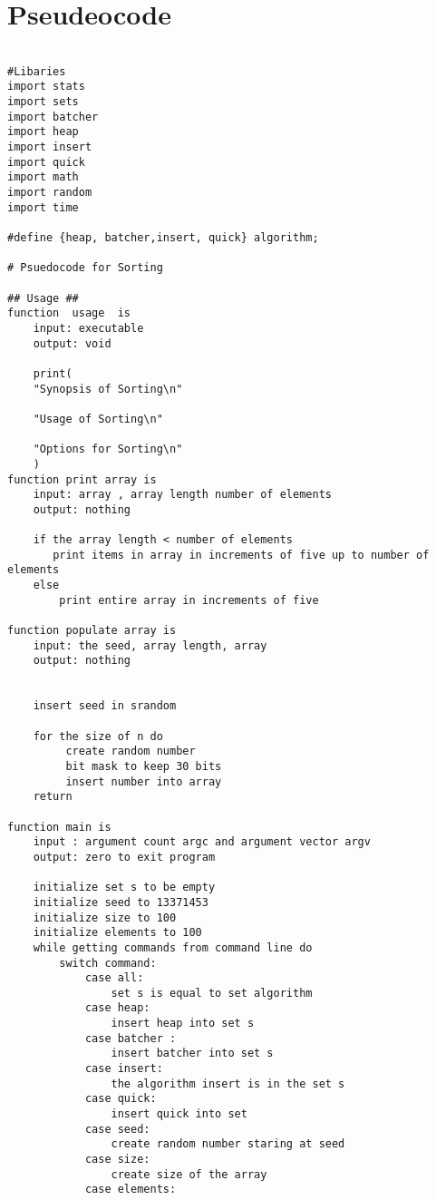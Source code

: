 \documentclass[11pt]{article} %
\begin{document}
\pagebreak
\section*{Pseudeocode}
\begin{flushleft}
\begin{lstlisting}

#Libaries
import stats
import sets
import batcher
import heap
import insert
import quick
import math
import random
import time

#define {heap, batcher,insert, quick} algorithm;

# Psuedocode for Sorting

## Usage ##
function  usage  is
    input: executable
    output: void

    print(
    "Synopsis of Sorting\n"

    "Usage of Sorting\n"

    "Options for Sorting\n"
    )
function print array is
    input: array , array length number of elements
    output: nothing
    
    if the array length < number of elements
       print items in array in increments of five up to number of elements
    else 
        print entire array in increments of five

function populate array is 
    input: the seed, array length, array
    output: nothing

    
    insert seed in srandom

    for the size of n do
         create random number
         bit mask to keep 30 bits
         insert number into array 
    return 

function main is 
    input : argument count argc and argument vector argv
    output: zero to exit program

    initialize set s to be empty
    initialize seed to 13371453
    initialize size to 100
    initialize elements to 100
    while getting commands from command line do
        switch command:
            case all:
                set s is equal to set algorithm
            case heap:
                insert heap into set s
            case batcher :
                insert batcher into set s
            case insert:
                the algorithm insert is in the set s
            case quick:
                insert quick into set
            case seed:
                create random number staring at seed
            case size:
                create size of the array
            case elements:


\end{lstlisting}
\end{flushleft}
\end{document}
